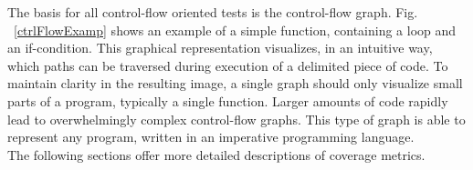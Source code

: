 	The basis for all control-flow oriented tests is the control-flow graph. Fig. ~\ref{ctrlFlowExamp} shows an example of a simple function, containing a loop and an if-condition. This graphical representation visualizes, in an intuitive way, which paths can be traversed during execution of a delimited piece of code. To maintain clarity in the resulting image, a single graph should only visualize small parts of a program, typically a single function. Larger amounts of code rapidly lead to overwhelmingly complex control-flow graphs. This type of graph is able to represent any program, written in an imperative programming language. \\
	
	The following sections offer more detailed descriptions of coverage metrics.
